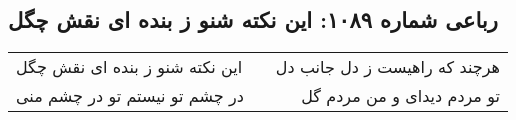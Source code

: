\begin{center}
\section*{رباعی شماره ۱۰۸۹: این نکته شنو ز بنده ای نقش چگل}
\label{sec:1089}
\begin{longtable}{l p{0.5cm} r}
این نکته شنو ز بنده ای نقش چگل
&&
هرچند که راهیست ز دل جانب دل
\\
در چشم تو نیستم تو در چشم منی
&&
تو مردم دیدای و من مردم گل
\\
\end{longtable}
\end{center}
